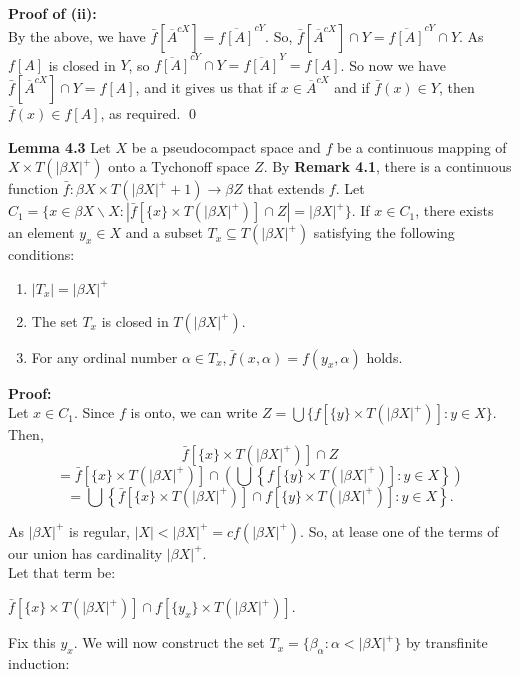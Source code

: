 \documentclass{article}
\begin{document}
\vskip 25pt

\textbf{Proof of (ii): }\\By the above, we have $\bar{f}\left[\overline{A}^{cX}\right] = \overline{f[A]}^{cY}$. So,  $\bar{f}\left[\overline{A}^{cX}\right]\cap Y = \overline{f[A]}^{cY} \cap Y$. As $f[A]$ is closed in $Y$, so  $\overline{f[A]}^{cY} \cap Y=\overline{f[A]}^Y=f[A]$. 
So now we have $\bar{f}\left[\overline{A}^{cX}\right]\cap Y= f[A]$, and it gives us that if $x \in  \overline{A}^{cX} $ and if $\bar{f}(x) \in Y$, then $\bar{f}(x) \in f[A]$, as required. \qed




\vskip 40pt



\textbf{Lemma 4.3} Let $X$ be a pseudocompact space and $f$ be a continuous mapping of $X\times T(|\beta X|^+) $
onto a Tychonoff space $Z$. By \textbf{Remark 4.1}, there is a continuous function $\bar{f}: \beta X \times T(|\beta X|^+ +1) \rightarrow \beta Z$ that extends $f$. Let $C_1=\{x\in  \beta X \backslash X: |\bar{f}[\{x\} \times T(|\beta X|^+)] \cap Z|=|\beta X|^+\}$.
If $x\in C_1$, there exists an element $y_x \in X$ and a subset $T_x \subseteq T(|\beta X|^+)$ satisfying the following conditions: 
\begin{enumerate}
	\item $|T_x|=|\beta X|^+$
	\item The set $T_x$ is closed in $T(|\beta X|^+).$
	\item For any ordinal number $\alpha \in T_x, \bar{f} (x,\alpha)=f(y_x,\alpha)$ holds.
\end{enumerate}

\vskip 20pt

\textbf{Proof:} \\
Let $x\in C_1$. Since $f$ is onto, we can write $Z=\bigcup \{f[\{y\}\times T(|\beta X|^+)]: y\in X\}$. Then,  $$\bar{f}[\{x\}\times T(|\beta X|^+)] \cap Z$$
$$=\bar{f}\left[\{x\}\times T(|\beta X|^+)\right] \cap \left(\bigcup \left\{f[\{y\}\times T(|\beta X|^+)]: y\in X\right\}\right)$$
$$=\bigcup \left\{\bar{f}\left[\{x\}\times T(|\beta X|^+)\right] \cap f\left[\{y\}\times T(|\beta X|^+)\right]: y\in X \right\}.$$

\vskip 5pt

As $|\beta X|^+$ is regular, $|X|<|\beta X|^+=cf(|\beta X|^+).$ So, at lease one of the terms of our union has cardinality $|\beta X|^+$. \\
Let that term be:
\begin{center}
 $ \bar{f}\left[\{x\}\times T(|\beta X|^+)\right] \cap f\left[\{y_x\} \times T(|\beta X |^+)\right]$.
\end{center}
Fix this $y_x$. We will now construct the set $T_x=\{\beta_\alpha: \alpha < |\beta X|^+\}$ by transfinite induction:\\
\end{document}
